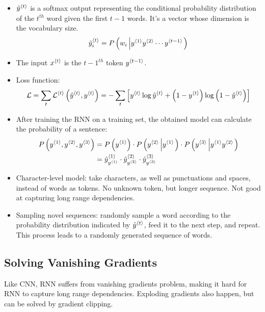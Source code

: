 \begin{itemize}
  \item $\hat{y}^{\left\langle t\right\rangle}$ is a softmax output representing the conditional probability distribution of the $t^{th}$ word given the first $t-1$ words. It's a vector whose dimension is the vocabulary size.
  \[\hat{y}^{\left\langle t\right\rangle}_i=P\left(w_i\left\vert y^{\left\langle 1\right\rangle}y^{\left\langle 2\right\rangle}\cdots y^{\left\langle t-1\right\rangle}\right.\right)\]
  \item The input $x^{\left\langle t\right\rangle}$ is the ${t-1}^{th}$ token $y^{\left\langle t-1\right\rangle}$.
  \item Loss function:
  \[\mathcal{L}=\displaystyle\sum_{t}\mathcal{L}^{\left\langle t\right\rangle}\left(\hat{y}^{\left\langle t\right\rangle},y^{\left\langle t\right\rangle}\right)=-\displaystyle\sum_{t}\left[y^{\left\langle t\right\rangle}\log\hat{y}^{\left\langle t\right\rangle}+\left(1-y^{\left\langle t\right\rangle}\right)\log\left(1-\hat{y}^{\left\langle t\right\rangle}\right)\right]\]
  \item After training the RNN on a training set, the obtained model can calculate the probability of a sentence:
  \begin{align*}
    P\left(y^{\left\langle 1\right\rangle},y^{\left\langle 2\right\rangle},y^{\left\langle 3\right\rangle}\right)&=P\left(y^{\left\langle 1\right\rangle}\right)\cdot P\left(y^{\left\langle 2\right\rangle}\left\vert y^{\left\langle 1\right\rangle}\right.\right)\cdot P\left(y^{\left\langle 3\right\rangle}\left\vert y^{\left\langle 1\right\rangle}y^{\left\langle 2\right\rangle}\right.\right)\\
    &=\hat{y}^{\left\langle 1\right\rangle}_{y^{\left\langle 1\right\rangle}}\cdot\hat{y}^{\left\langle 2\right\rangle}_{y^{\left\langle 2\right\rangle}}\cdot\hat{y}^{\left\langle 3\right\rangle}_{y^{\left\langle 3\right\rangle}}
  \end{align*}
  \item Character-level model: take characters, as well as punctuations and spaces, instead of words as tokens. No unknown token, but longer sequence. Not good at capturing long range dependencies.
  \item Sampling novel sequences: randomly sample a word according to the probability distribution indicated by $\hat{y}^{\left\langle t\right\rangle}$, feed it to the next step, and repeat. This process leads to a randomly generated sequence of words.
\end{itemize}
\subsection{Solving Vanishing Gradients}
Like CNN, RNN suffers from vanishing gradients problem, making it hard for RNN to capture long range dependencies. Exploding gradients also happen, but can be solved by gradient clipping.
